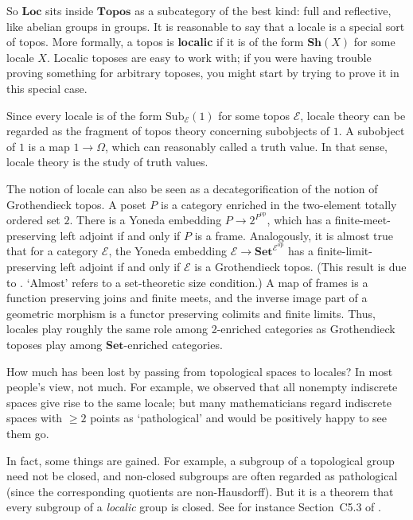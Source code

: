 \documentclass{article}
\newcommand{\cat}[1]{\mathscr{#1}}
\newcommand{\fcat}[1]{\mathbf{#1}}
\newcommand{\op}{\mathrm{op}}
\newcommand{\Set}{\fcat{Set}}
\newcommand{\demph}[1]{\textbf{\textup{#1}}}
\newcommand{\E}{\cat{E}}
\newcommand{\Sub}{\mathrm{Sub}}
\newcommand{\Sh}{\fcat{Sh}}
\newcommand{\Topos}{\fcat{Topos}}
\newcommand{\Loc}{\fcat{Loc}}
\begin{document}
So $\Loc$ sits inside $\Topos$ as a subcategory of the best kind: full and
reflective, like abelian groups in groups.  It is reasonable to say
that a locale is a special sort of topos.  More formally, a topos is
\demph{localic} if it is of the form $\Sh(X)$ for some locale $X$.  Localic
toposes are easy to work with; if you were having trouble proving something
for arbitrary toposes, you might start by trying to prove it in this
special case.  

Since every locale is of the form $\Sub_\E(1)$ for some topos $\E$, locale
theory can be regarded as the fragment of topos theory concerning subobjects
of $1$.  A subobject of $1$ is a map $1 \to \Omega$, which can reasonably
called a truth value.  In that sense, locale theory is the study of truth
values. 

The notion of locale can also be seen as a decategorification of the notion of
Grothendieck topos.  A poset $P$ is a category enriched in the two-element
totally ordered set $2$.  There is a Yoneda embedding $P \to 2^{P^\op}$, which
has a finite-meet-preserving left adjoint if and only if $P$ is a frame.
Analogously, it is almost true that for a category $\E$, the Yoneda embedding
$\E \to \Set^{\E^\op}$ has a finite-limit-preserving left adjoint if and only
if $\E$ is a Grothendieck topos.  (This result is due to \citet{StrNT}.
`Almost' refers to a set-theoretic size condition.)  A map of frames is a
function preserving joins and finite meets, and the inverse image
part of a geometric morphism is a functor preserving colimits and finite
limits.  Thus, locales play roughly the same role among 2-enriched categories
as Grothendieck toposes play among $\Set$-enriched categories.

How much has been lost by passing from topological spaces to locales?  In most
people's view, not much.  For example, we observed that all nonempty
indiscrete spaces give rise to the same locale; but many mathematicians regard
indiscrete spaces with $\geq 2$ points as `pathological' and would be
positively happy to see them go.

In fact, some things are gained.  For example, a subgroup of a topological
group need not be closed, and non-closed subgroups are often regarded as
pathological (since the corresponding quotients are non-Hausdorff).  But it
is a theorem that every subgroup of a \emph{localic} group is closed.  See for
instance Section~C5.3 of \citet{JohSE}.
\end{document}
